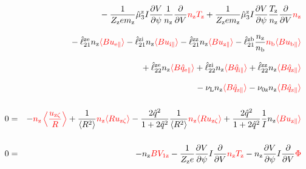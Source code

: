 \documentclass[11pt]{article}
\def\r#1{{\rm#1}}
\def\ave#1{\left\langle#1\right\rangle}
\def\aves#1{\langle#1\rangle}
\def\dd#1#2{\frac{\partial #1}{\partial #2}}
\def\para{\parallel}
\def\ddV{\frac{\partial}{\partial V}}
\def\mz{m_\r{z}}
\def\nz{n_\r{z}}
\def\nb{n_\r{b}}
\def\Tz{T_\r{z}}
\def\Zz{Z_\r{z}}
\def\uzt#1{u_{\r{#1}\zeta}}
\def\upara#1{u_{\r{#1}\para}}
\def\qhatpara#1{\hat{q}_{\r{#1}\para}}
\def\nun#1{\nu_\r{0#1}}
\def\nuL{\nu_\r{L}}
\def\red#1{\textcolor{red}{#1}}
\begin{document}
\begin{eqnarray}
\nonumber\\[3mm]&&{}
%
  - \frac{1}{\Zz e\mz} \hat{\mu}_3^\r{z} I \dd{V}{\psi} \frac{1}{\nz}
  \ddV \red{\nz\Tz}
  + \frac{1}{\Zz e\mz} \hat{\mu}_3^\r{z} I \dd{V}{\psi} \frac{\Tz}{\nz}
  \ddV \red{\nz}
\nonumber\\[3mm]&&{}
%
  - \hat{\ell}_{21}^{\r{ze}} \nz \red{\aves{B \upara{e}}} 
  - \hat{\ell}_{21}^{\r{zi}} \nz \red{\aves{B \upara{i}}} 
  - \hat{\ell}_{21}^{\r{zz}} \nz \red{\aves{B \upara{z}}} 
  - \hat{\ell}_{21}^{\r{zb}} \frac{\nz}{\nb} \red{\nb \aves{B \upara{b}}} 
\nonumber\\[3mm]&&{}
%
  + \hat{\ell}_{22}^{\r{ze}} \nz \red{\aves{B \qhatpara{e}}} 
  + \hat{\ell}_{22}^{\r{zi}} \nz \red{\aves{B \qhatpara{i}}} 
  + \hat{\ell}_{22}^{\r{zz}} \nz \red{\aves{B \qhatpara{z}}} 
\nonumber\\[3mm]&&{}
%
  - \nuL \nz \red{\aves{B \qhatpara{z}}}
%
  - \nun{z} \nz \red{\aves{B \qhatpara{z}}}
\\[5mm]
  0 &=&
%
  - \red{\nz \ave{\frac{\uzt{z}}{R}}}
%
  + \frac{1}{\aves{R^2}} \red{\nz \aves{R\uzt{z}}}
%
  - \frac{2\hat{q}^2}{1+2\hat{q}^2} \frac{1}{\aves{R^2}}\red{\nz\aves{R\uzt{z}}}
%
  + \frac{2\hat{q}^2}{1+2\hat{q}^2} \frac{1}{I}\nz \red{\aves{B\upara{z}}}
\\[5mm]
    0 &=&
%
  - \nz \red{BV_{1\r{z}}}
%
  - \frac{1}{\Zz e} \dd{V}{\psi} I \ddV \red{\nz\Tz}
%
  - \nz \dd{V}{\psi} I \ddV \red{\Phi}
\end{eqnarray}
%

\clearpage
\end{document}
